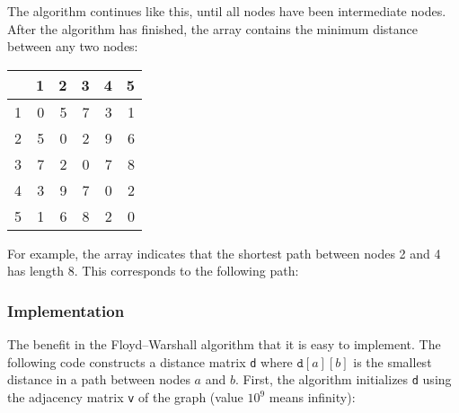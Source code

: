 The algorithm continues like this,
until all nodes have been intermediate nodes.
After the algorithm has finished, the array contains
the minimum distance between any two nodes:

\begin{center}
\begin{tabular}{r|rrrrr}
 & 1 & 2 & 3 & 4 & 5 \\
\hline
1 & 0 & 5 & 7 & 3 & 1 \\
2 & 5 & 0 & 2 & 9 & 6 \\
3 & 7 & 2 & 0 & 7 & 8 \\
4 & 3 & 9 & 7 & 0 & 2 \\
5 & 1 & 6 & 8 & 2 & 0 \\
\end{tabular}
\end{center}

For example, the array indicates that the
shortest path between nodes 2 and 4 has length 8.
This corresponds to the following path:

\begin{center}
\end{center}

\subsubsection{Implementation}

The benefit in the
Floyd–Warshall algorithm that it is
easy to implement.
The following code constructs a
distance matrix \texttt{d} where $\texttt{d}[a][b]$
is the smallest distance in a path between nodes $a$ and $b$.
First, the algorithm initializes \texttt{d}
using the adjacency matrix \texttt{v} of the graph
(value $10^9$ means infinity):

